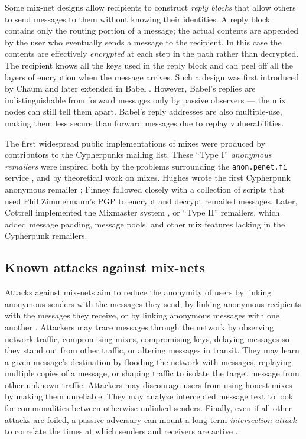 \documentclass[final]{ieee}
\begin{document}
Some mix-net designs allow recipients to construct \emph{reply blocks}
that allow others to send messages to them without knowing their
identities. A reply block contains only the routing portion of a message;
the actual contents are appended by the user who eventually sends a
message to the recipient. In this case the contents are effectively
\emph{encrypted} at each step in the path rather than decrypted.
The recipient knows all the keys used in the reply block and can peel
off all the layers of encryption when the message arrives. Such a design
was first introduced by Chaum \cite{chaum-mix} and later extended in
Babel \cite{babel}. However, Babel's replies are indistinguishable from
forward messages only by passive observers --- the mix nodes can still
tell them apart. Babel's reply addresses are also multiple-use, making them
less secure than forward messages due to replay vulnerabilities.

The first widespread public implementations of mixes were produced by
contributors to the Cypherpunks mailing list. These ``Type I''
\emph{anonymous remailers} 
were inspired both by the problems surrounding the {\tt anon.penet.fi}
service \cite{helsingius}, and by theoretical work on mixes. Hughes
wrote the first Cypherpunk anonymous remailer \cite{remailer-history};
Finney followed closely with a collection of scripts that used Phil
Zimmermann's PGP to encrypt and decrypt remailed messages. Later, Cottrell
implemented the Mixmaster system \cite{mixmaster-attacks}\cite{mixmaster-spec},
or ``Type II'' remailers, which added message padding, message pools,
and other mix features lacking in the Cypherpunk remailers.

\subsection{Known attacks against mix-nets}

Attacks against mix-nets aim to reduce the anonymity of users by
linking anonymous senders with the messages they send, by linking
anonymous recipients with the messages they receive, or by linking
anonymous messages with one another \cite{raymond00}.  Attackers may
trace messages through the network by observing network
traffic, compromising mixes, compromising keys, delaying messages
so they stand out from other traffic, or altering messages
in transit.  They may learn a given message's destination
by flooding the network with messages, replaying multiple copies
of a message, or shaping traffic to isolate the target message from
other unknown traffic. Attackers may discourage users from
using honest mixes by making them unreliable. They may analyze
intercepted message text to look for commonalities between otherwise
unlinked senders.
Finally, even if all other attacks are foiled, a passive adversary can
mount a long-term \emph{intersection attack} to correlate the times at
which senders and receivers are active \cite{disad-free-routes}.
\end{document}
